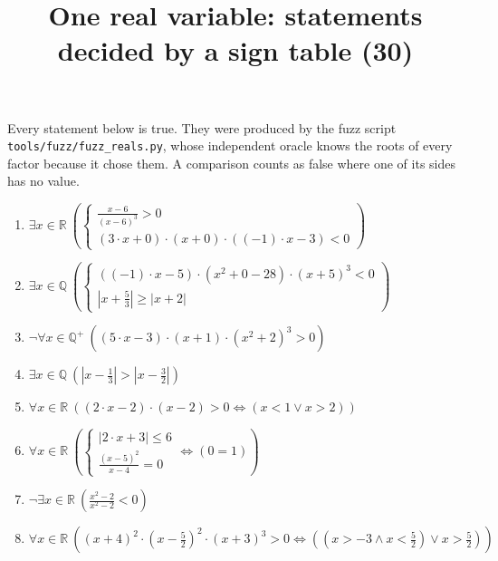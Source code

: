 \documentclass[11pt,a4paper]{article}
\title{One real variable: statements decided by a sign table (30)}
\author{}
\date{}
\begin{document}
\maketitle
Every statement below is true. They were produced by the fuzz script \texttt{tools/fuzz/fuzz\_reals.py}, whose independent oracle knows the roots of every factor because it chose them. A comparison counts as false where one of its sides has no value.

\begin{enumerate}
\item $\displaystyle \exists x \in \mathbb{R}\ \left( \begin{cases} \frac{x - 6}{\left(x - 6\right)^{3}} > 0 \\ \left(3 \cdot x + 0\right) \cdot \left(x + 0\right) \cdot \left(\left(-1\right) \cdot x - 3\right) < 0 \end{cases} \right)$
\item $\displaystyle \exists x \in \mathbb{Q}\ \left( \begin{cases} \left(\left(-1\right) \cdot x - 5\right) \cdot \left(x^{2} + 0 - 28\right) \cdot \left(x + 5\right)^{3} < 0 \\ \left|x + \frac{5}{3}\right| \ge \left|x + 2\right| \end{cases} \right)$
\item $\displaystyle \lnot \forall x \in \mathbb{Q}^{+}\ \left( \left(5 \cdot x - 3\right) \cdot \left(x + 1\right) \cdot \left(x^{2} + 2\right)^{3} > 0 \right)$
\item $\displaystyle \exists x \in \mathbb{Q}\ \left( \left|x - \frac{1}{3}\right| > \left|x - \frac{3}{2}\right| \right)$
\item $\displaystyle \forall x \in \mathbb{R}\ \left( \left(2 \cdot x - 2\right) \cdot \left(x - 2\right) > 0 \iff \left( x < 1 \lor x > 2 \right) \right)$
\item $\displaystyle \forall x \in \mathbb{R}\ \left( \begin{cases} \left|2 \cdot x + 3\right| \le 6 \\ \frac{\left(x - 5\right)^{2}}{x - 4} = 0 \end{cases} \iff \left( 0 = 1 \right) \right)$
\item $\displaystyle \lnot \exists x \in \mathbb{R}\ \left( \frac{x^{2} - 2}{x^{2} - 2} < 0 \right)$
\item $\displaystyle \forall x \in \mathbb{R}\ \left( \left(x + 4\right)^{2} \cdot \left(x - \frac{5}{2}\right)^{2} \cdot \left(x + 3\right)^{3} > 0 \iff \left( \left(x > -3 \land x < \frac{5}{2}\right) \lor x > \frac{5}{2} \right) \right)$

\end{enumerate}
\end{document}
